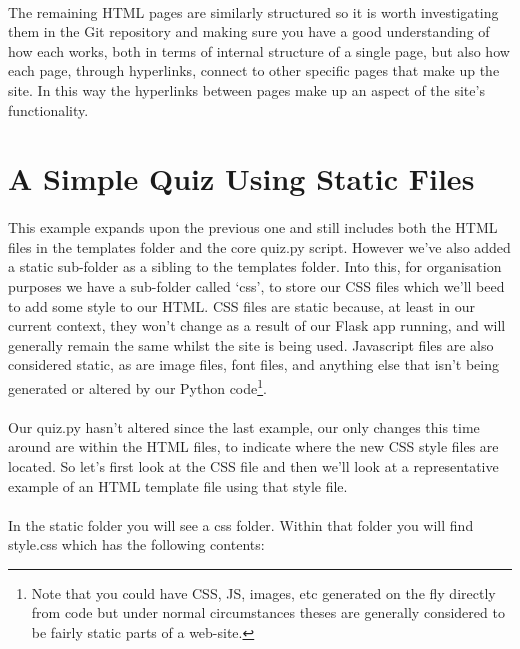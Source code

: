 \paragraph{} The remaining HTML pages are similarly structured so it is worth investigating them in the Git repository and making sure you have a good understanding of how each works, both in terms of internal structure of a single page, but also how each page, through hyperlinks, connect to other specific pages that make up the site. In this way the hyperlinks between pages make up an aspect of the site's functionality.



\section{A Simple Quiz Using Static Files}
\paragraph{} This example expands upon the previous one and still includes both the HTML files in the templates folder and the core quiz.py script. However we've also added a static sub-folder as a sibling to the templates folder. Into this, for organisation purposes we have a sub-folder called `css', to store our CSS files which we'll beed to add some style to our HTML. CSS files are static because, at least in our current context, they won't change as a result of our Flask app running, and will generally remain the same whilst the site is being used. Javascript files are also considered static, as are image files, font files, and anything else that isn't being generated or altered by our Python code\footnote{Note that you could have CSS, JS, images, etc generated on the fly directly from code but under normal circumstances theses are generally considered to be fairly static parts of a web-site.}.

\paragraph{} Our quiz.py hasn't altered since the last example, our only changes this time around are within the HTML files, to indicate where the new CSS style files are located. So let's first look at the CSS file and then we'll look at a representative example of an HTML template file using that style file.

\paragraph{} In the static folder you will see a css folder. Within that folder you will find style.css which has the following contents:

